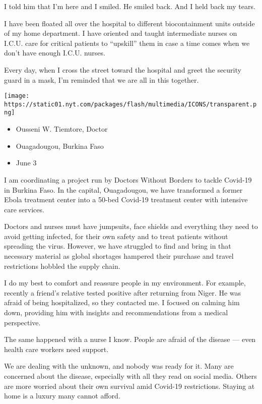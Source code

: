 I told him that I'm here and I smiled. He smiled back. And I held back
my tears.

I have been floated all over the hospital to different biocontainment
units outside of my home department. I have oriented and taught
intermediate nurses on I.C.U. care for critical patients to ``upskill''
them in case a time comes when we don't have enough I.C.U. nurses.

Every day, when I cross the street toward the hospital and greet the
security guard in a mask, I'm reminded that we are all in this together.

\texttt{[image: https://static01.nyt.com/packages/flash/multimedia/ICONS/transparent.png]}

\begin{itemize}
\tightlist
\item
  Ousseni W. Tiemtore, Doctor
\item
  Ouagadougou, Burkina Faso
\item
  June 3
\end{itemize}

I am coordinating a project run by Doctors Without Borders to tackle
Covid-19 in Burkina Faso. In the capital, Ouagadougou, we have
transformed a former Ebola treatment center into a 50-bed Covid-19
treatment center with intensive care services.

Doctors and nurses must have jumpsuits, face shields and everything they
need to avoid getting infected, for their own safety and to treat
patients without spreading the virus. However, we have struggled to find
and bring in that necessary material as global shortages hampered their
purchase and travel restrictions hobbled the supply chain.

I do my best to comfort and reassure people in my environment. For
example, recently a friend's relative tested positive after returning
from Niger. He was afraid of being hospitalized, so they contacted me. I
focused on calming him down, providing him with insights and
recommendations from a medical perspective.

The same happened with a nurse I know. People are afraid of the disease
--- even health care workers need support.

We are dealing with the unknown, and nobody was ready for it. Many are
concerned about the disease, especially with all they read on social
media. Others are more worried about their own survival amid Covid-19
restrictions. Staying at home is a luxury many cannot afford.


